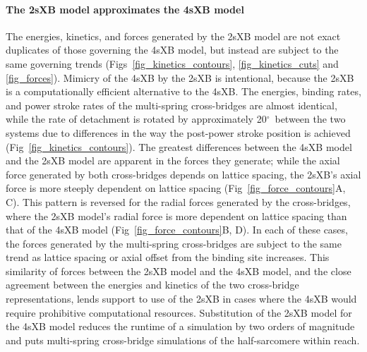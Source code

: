 \documentclass[10pt]{article}
\newcommand{\de}{$^\circ$~} %
\begin{document}
\paragraph*{The 2sXB model approximates the 4sXB model} %
The energies, kinetics, and forces generated by the 2sXB model are not exact duplicates of those governing the 4sXB model, but instead are subject to the same governing trends (Figs~\ref{fig_kinetics_contours}, \ref{fig_kinetics_cuts} and \ref{fig_forces}). 
Mimicry of the 4sXB by the 2sXB is intentional, because the 2sXB is a computationally efficient alternative to the 4sXB\@.  
The energies, binding rates, and power stroke rates of the multi-spring cross-bridges are almost identical, while the rate of detachment is rotated by approximately 20\de between the two systems due to differences in the way the post-power stroke position is achieved (Fig~\ref{fig_kinetics_contours}).
The greatest differences between the 4sXB model and the 2sXB model are apparent in the forces they generate; while the axial force generated by both cross-bridges depends on lattice spacing, the 2sXB's axial force is more steeply dependent on lattice spacing (Fig~\ref{fig_force_contours}A, C). 
This pattern is reversed for the radial forces generated by the cross-bridges, where the 2sXB model's radial force is more dependent on lattice spacing than that of the 4sXB model (Fig~\ref{fig_force_contours}B, D).  
In each of these cases, the forces generated by the multi-spring cross-bridges are subject to the same trend as lattice spacing or axial offset from the binding site increases.
This similarity of forces between the 2sXB model and the 4sXB model, and the close agreement between the energies and kinetics of the two cross-bridge representations, lends support to use of the 2sXB in cases where the 4sXB would require prohibitive computational resources.
Substitution of the 2sXB model for the 4sXB model reduces the runtime of a simulation by two orders of magnitude and puts multi-spring cross-bridge simulations of the half-sarcomere within reach.
\end{document}

